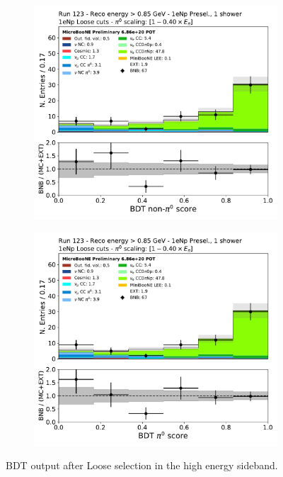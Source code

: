 \begin{figure}[H]
    \begin{center}
    \begin{subfigure}{0.32\textwidth}
    \includegraphics[width=1.00\textwidth]{Sidebands/Figures/1eNp/HighEnergy/HiEext_NPOneShr_NPL_pi0e040/nonpi0_score.pdf}
    \end{subfigure}
    \begin{subfigure}{0.32\textwidth}
    \includegraphics[width=1.00\textwidth]{Sidebands/Figures/1eNp/HighEnergy/HiEext_NPOneShr_NPL_pi0e040/pi0_score.pdf}
    \end{subfigure}
\caption{\label{fig:sb:1eNp:he:L:bdtscores} BDT output after Loose selection in the \npsel high energy sideband.}
    \end{center}
\end{figure}

